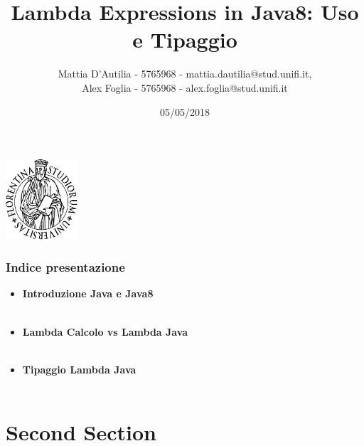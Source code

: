 \documentclass{beamer}
\title[Lambda in Java8]{Lambda Expressions in Java8: Uso e Tipaggio}
\author[]{Mattia D'Autilia - 5765968 - mattia.dautilia@stud.unifi.it,\\ Alex Foglia - 5765968 - alex.foglia@stud.unifi.it}
\date{05/05/2018}
\begin{document}
\begin{frame}
	\begin{center}
  		\includegraphics[width=0.2\textwidth]{assets/logo-unifi.png}
  	\end{center}
	\titlepage 
\end{frame}

\begin{frame}
	\frametitle{Indice presentazione}
	\begin{itemize}
		\item
			\textbf{Introduzione Java e Java8}\\\
		\item
			\textbf{Lambda Calcolo vs Lambda Java}\\\
		\item
			\textbf{Tipaggio Lambda Java}\\\
	\end{itemize}
\end{frame}


\begin{frame}
\end{frame}


\begin{frame}
\end{frame}


\begin{frame}
\end{frame}

\section{Second Section}

\begin{frame}
\end{frame}

\end{document}
